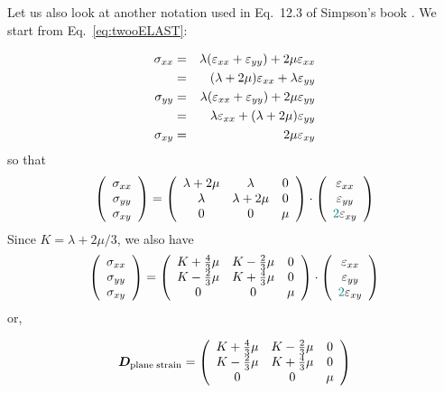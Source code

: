 Let us also look at another notation used in Eq.~12.3 of Simpson's book \cite{simp17}. 
We start from Eq.~\eqref{eq:twooELAST}:

\begin{eqnarray}
\sigma_{xx} 
&=& \lambda (\varepsilon_{xx}+\varepsilon_{yy}) + 2\mu \varepsilon_{xx} \nonumber\\
&=& (\lambda+2\mu)\varepsilon_{xx} +\lambda \varepsilon_{yy} \nonumber\\
\sigma_{yy}
&=& \lambda (\varepsilon_{xx}+\varepsilon_{yy}) + 2\mu \varepsilon_{yy} \nonumber\\
&=& \lambda \varepsilon_{xx} + (\lambda+2\mu)\varepsilon_{yy} \nonumber\\
\sigma_{xy} &=& 2 \mu \varepsilon_{xy} 
\end{eqnarray}
so that
\[
\left(
\begin{array}{c}
\sigma_{xx}\\
\sigma_{yy}\\
\sigma_{xy}
\end{array}
\right)
=
\left(
\begin{array}{ccc}
\lambda+2\mu & \lambda & 0 \\
\lambda & \lambda+2\mu &  0 \\
0 &0 & \mu
\end{array}
\right)
\cdot
\left(
\begin{array}{c}
\varepsilon_{xx}\\
\varepsilon_{yy}\\
{\color{teal}2}\varepsilon_{xy}
\end{array}
\right) 
\]
Since $K=\lambda+2\mu/3$, we also have
\[
\left(
\begin{array}{c}
\sigma_{xx}\\
\sigma_{yy}\\
\sigma_{xy}
\end{array}
\right)
=
\left(
\begin{array}{ccc}
K+\frac43 \mu & K-\frac23 \mu & 0 \\
K-\frac23 \mu & K+\frac43 \mu & 0 \\
0 & 0 & \mu
\end{array}
\right)
\cdot
\left(
\begin{array}{c}
\varepsilon_{xx}\\
\varepsilon_{yy}\\
{\color{teal}2}\varepsilon_{xy}
\end{array}
\right) 
\]
or,
\begin{mdframed}[backgroundcolor=blue!5]
\[
{\bm D}_{\rm plane \; strain}=
\left(
\begin{array}{ccc}
K+\frac43 \mu & K-\frac23 \mu & 0 \\
K-\frac23 \mu & K+\frac43 \mu & 0 \\
0 & 0 & \mu
\end{array}
\right)
\]
\end{mdframed}

